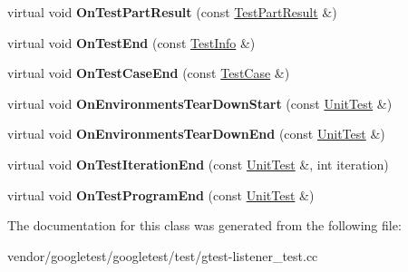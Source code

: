 \begin{DoxyCompactItemize}
virtual void {\bfseries On\+Test\+Part\+Result} (const \hyperlink{classtesting_1_1_test_part_result}{Test\+Part\+Result} \&)
\item 
\mbox{\label{classtesting_1_1internal_1_1_event_recording_listener_adb076f145cc20d9b27441b9c75da4b81}} 
virtual void {\bfseries On\+Test\+End} (const \hyperlink{classtesting_1_1_test_info}{Test\+Info} \&)
\item 
\mbox{\label{classtesting_1_1internal_1_1_event_recording_listener_a4d0cb8a389c7339bce0aa6128291529f}} 
virtual void {\bfseries On\+Test\+Case\+End} (const \hyperlink{classtesting_1_1_test_case}{Test\+Case} \&)
\item 
\mbox{\label{classtesting_1_1internal_1_1_event_recording_listener_a17eebd7bb5cc6bab53b20794919ca5ae}} 
virtual void {\bfseries On\+Environments\+Tear\+Down\+Start} (const \hyperlink{classtesting_1_1_unit_test}{Unit\+Test} \&)
\item 
\mbox{\label{classtesting_1_1internal_1_1_event_recording_listener_acd5a3dc070265166a7da68222031fd61}} 
virtual void {\bfseries On\+Environments\+Tear\+Down\+End} (const \hyperlink{classtesting_1_1_unit_test}{Unit\+Test} \&)
\item 
\mbox{\label{classtesting_1_1internal_1_1_event_recording_listener_ab0cc007bcfaf06cd383d574c88f62aea}} 
virtual void {\bfseries On\+Test\+Iteration\+End} (const \hyperlink{classtesting_1_1_unit_test}{Unit\+Test} \&, int iteration)
\item 
\mbox{\label{classtesting_1_1internal_1_1_event_recording_listener_a21fe9c3c519c4599a48b16ddfb734aa3}} 
virtual void {\bfseries On\+Test\+Program\+End} (const \hyperlink{classtesting_1_1_unit_test}{Unit\+Test} \&)
\end{DoxyCompactItemize}


The documentation for this class was generated from the following file\+:\begin{DoxyCompactItemize}
\item 
vendor/googletest/googletest/test/gtest-\/listener\+\_\+test.\+cc\end{DoxyCompactItemize}
